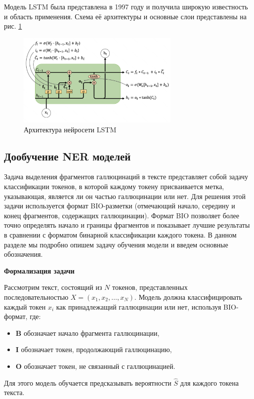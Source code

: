 \documentclass[12pt]{article}
\begin{document}
Модель LSTM была представлена в 1997 году \cite{lstm} и получила широкую известность и область применения. Схема её архитектуры и основные слои представлены на рис. \ref{fig:LSTM}

\begin{figure}[h]
    \centering
    \includegraphics[width=0.7\textwidth]{images/LSTM.PNG}
    \caption{Архитектура нейросети LSTM}
    \label{fig:LSTM}
\end{figure}

\subsection{Дообучение NER моделей}
Задача выделения фрагментов галлюцинаций в тексте представляет собой задачу классификации токенов, в которой каждому токену присваивается метка, указывающая, является ли он частью галлюцинации или нет. Для решения этой задачи используется формат BIO-разметки (отмечающий начало, середину и конец фрагментов, содержащих галлюцинации). Формат BIO позволяет более точно определять начало и границы фрагментов и показывает лучшие результаты в сравнении с форматом бинарной классификации каждого токена. В данном разделе мы подробно опишем задачу обучения модели и введем основные обозначения.

\textbf{Формализация задачи}


Рассмотрим текст, состоящий из \( N \) токенов, представленных последовательностью \( X = (x_1, x_2, \ldots, x_N) \). Модель должна классифицировать каждый токен \( x_i \) как принадлежащий галлюцинации или нет, используя BIO-формат, где:
\begin{itemize}
\item \textbf{B} обозначает начало фрагмента галлюцинации,
\item \textbf{I} обозначает токен, продолжающий галлюцинацию,
\item \textbf{O} обозначает токен, не связанный с галлюцинацией.
\end{itemize}
Для этого модель обучается предсказывать вероятности \( \hat{S} \) для каждого токена текста.
\end{document}
